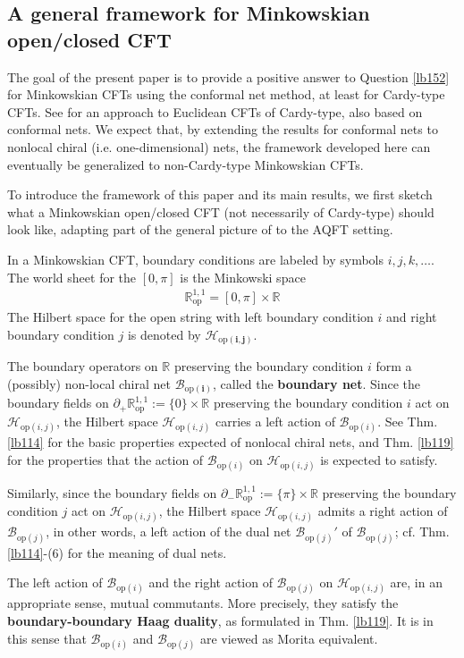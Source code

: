 \documentclass[11pt,b5paper,notitlepage]{article}
\theoremstyle{definition}
\theoremstyle{plain}
\newcommand{\Rbb}{\mathbb R}
\newcommand{\Rop}{\mathbb R^{1,1}_{\mathrm{op}}}
\newcommand{\Bopi}{\mathcal B_{\mathrm{op}(i)}}
\newcommand{\Bopj}{\mathcal B_{\mathrm{op}(j)}}
\newcommand{\Hopij}{\mathcal H_{\mathrm{op}(i,j)}}
\numberwithin{equation}{section}
\begin{document}
\subsection{A general framework for Minkowskian open/closed CFT}\label{lb163}


The goal of the present paper is to provide a positive answer to Question \ref{lb152} for Minkowskian CFTs using the conformal net method, at least for Cardy-type CFTs. See \cite{HT26} for an approach to Euclidean CFTs of Cardy-type, also based on conformal nets. We expect that, by extending the results for conformal nets to nonlocal chiral (i.e. one-dimensional) nets, the framework developed here can eventually be generalized to non-Cardy-type Minkowskian CFTs.


To introduce the framework of this paper and its main results, we first sketch what a Minkowskian open/closed CFT (not necessarily of Cardy-type) should look like, adapting part of the general picture of \cite{FRS02,FRS05,FFRS06} to the AQFT setting.


In a Minkowskian CFT, boundary conditions are labeled by symbols $i,j,k,\dots$. The world sheet for the  $[0,\pi]$ is the Minkowski space
\begin{align*}
\Rop=[0,\pi]\times\Rbb
\end{align*}
The Hilbert space for the open string with left boundary condition $i$ and right boundary condition $j$ is denoted by $\pmb{\Hopij}$. 

The boundary operators on $\Rbb$ preserving the boundary condition $i$ form a (possibly) non-local chiral net $\pmb{\Bopi}$, called the \textbf{boundary net}. Since the boundary fields on $\partial_+\Rop:=\{0\}\times\Rbb$ preserving the boundary condition $i$ act on $\Hopij$, the Hilbert space $\Hopij$ carries a left action of $\Bopi$. See Thm. \ref{lb114} for the basic properties expected of nonlocal chiral nets, and Thm. \ref{lb119} for the properties that the action of $\Bopi$ on $\Hopij$ is expected to satisfy.

Similarly, since the boundary fields on $\partial_-\Rop:=\{\pi\}\times\Rbb$ preserving the boundary condition $j$ act on $\Hopij$, the Hilbert space $\Hopij$ admits a right action of $\Bopj$, in other words, a left action of the dual net $\Bopj'$ of $\Bopj$; cf. Thm. \ref{lb114}-(6) for the meaning of dual nets. 

The left action of $\Bopi$ and the right action of $\Bopj$ on $\Hopij$ are, in an appropriate sense, mutual commutants. More precisely, they satisfy the \textbf{boundary-boundary Haag duality}, as formulated in Thm. \ref{lb119}. It is in this sense that $\Bopi$ and $\Bopj$ are viewed as Morita equivalent.
\end{document}
